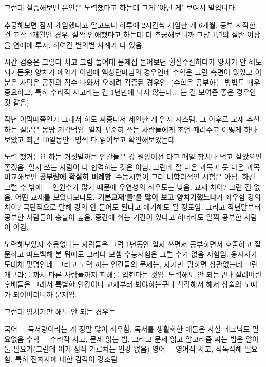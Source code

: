 그런데 실증해보면 본인은 노력했다고 하는데 그게 '아닌 게' 보여서 말입니다.
\vspace{5mm}

추궁해보면 잠시 게임했다고 알고보니 하루에 2시간씩 게임한 게 6개월. 공부 시작한 건 고작 4개월인 경우.
살짝 연애했다고 하는데 더 추궁해보니까 그냥 1년의 절반 이상을 연애에 투자.
하여간 별의별 사례가 다 있음.
\vspace{5mm}

시간 검증은 그렇다 치고 그럼 풀어대 문제집 물어보면 횡설수설하다가 양치기 안 해도 되거든욧!
양치기 예외가 이번에 액상탄마님의 경우인데 수학은 그런 측면이 있었고 이 분은 사탐은 공전의 점수 나와서 오히려 검증된 경우임.
(수학은 공부하는 방법도 매우 중요하고, 특히 수리적 사고라는 건 1년만에 되지 않는다... 는 걸 보여준 좋은 경우인 것 같음)
\vspace{5mm}

작년 이맘때쯤인가 그래서 하도 짜증나서 제안한 게 일지 시스템.
그 이후로 교재 추천하는 질문은 몽땅 기각먹임.
일지 꾸준히 쓰는 사람들에게 조언 때려주고 어떻게 하나보았고
최근 10일동안 1명씩 다 읽어보고 확인해보았는데.
\vspace{5mm}

노력 했거든요 하는 거짓말까는 인간들은 걍 원양어선 타고 매일 참치나 먹고 살았으면 좋겠음.
일지 쓰는 사람이 다 합격하는 것은 아님.
그런데 잘 나온 과목과 못 나온 과목 비교해보면 \textbf{공부량에 확실히 비례함}.
수능시험이 그리 비합리적인 시험은 아님. 하긴 그럴 수 밖에 $-$ 인원수가 많기 때문에 우연성의 좌우도는 낮음.
교재 차이? 그런 건 없음. 어떤 교재를 보았냐보다도\textbf{, 기본교재'들'을 많이 보고 양치기했느냐}가 좌우함
강의 차이? 극단적으로 말해 강의 안 들어도 된다고 얘기해도 될 정도임.
그리고 작년말부터 공부한 사람들이 승률이 높음, 중간에 쉬는 기간이 있다고 하더라도 일찍 공부한 사람이 이김.
\vspace{5mm}

노력해보았자 소용없다는 사람들은 그럼 1년동안
일지 쓰면서 공부하면서 호출하고 질문하고 피드백해 본 뒤에도 그러나 보셈
수능시험은 그럴 수가 없음 시험임. 응시자가 도대체 몇명인데.
그리고 노력 까는 인간들의 문제는, 자기만 망하면 상관없는데
그런 개구라를 까서 다른 사람들까지 피해를 입힌다는 것임.
노력해도 안 되는구나 질려버린 후배들은
그래서 특별한 인강이나 교재부터 봐야하는구나 착각해서 해서 상술의 노예가 되어버리니까 문제임.
\vspace{5mm}

그런데 양치기만 해도 안 되는 경우는
\vspace{5mm}

국어 $-$ 독서량이라는 게 정말 많이 좌우함. 독서를 생활화한 애들은 사실 테크닉도 필요없음
수학 $-$ 수리적 사고, 문제 읽는 법, 그리고 문제 읽고 알고리즘 짜는 법은 알아둘 필요가(그런데 이거 정작 가르치는 인강 없음)
영어 $-$ 영어적 사고, 직독직해 필요함. 특히 전치사에 대한 감각이 강조됨
\vspace{5mm}

